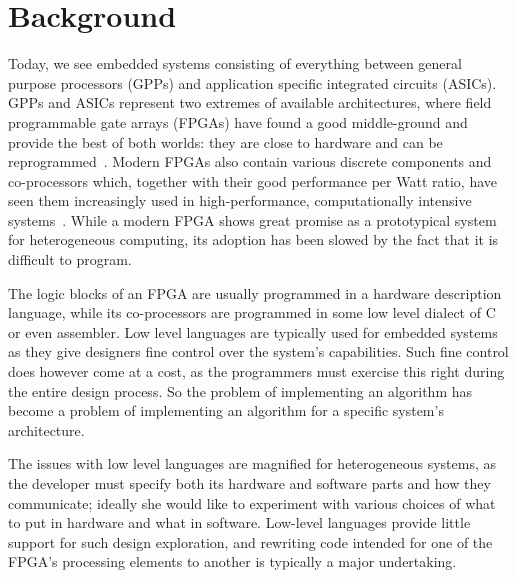 \documentclass[../paper.tex]{subfiles}
\begin{document}
\chapter{Background}
\label{background}


Today, we see embedded systems consisting of everything between general purpose processors (GPPs) and application specific integrated circuits (ASICs). GPPs and ASICs represent two extremes of available architectures, where field programmable gate arrays (FPGAs) have found a good middle-ground and provide the best of both worlds: they are close to hardware and can be reprogrammed~\cite{bacon2013}. Modern FPGAs also contain various discrete components and co-processors which, together with their good performance per Watt ratio, have seen them increasingly used in high-performance, computationally intensive systems~\cite{mcmillan2014}. While a modern FPGA shows great promise as a prototypical system for heterogeneous computing, its adoption has been slowed by the fact that it is difficult to program.


The logic blocks of an FPGA are usually programmed in a hardware description language, while its co-processors are programmed in some low level dialect of C or even assembler. Low level languages are typically used for embedded systems as they give designers fine control over the system's capabilities. Such fine control does however come at a cost, as the programmers must exercise this right during the entire design process. So the problem of implementing an algorithm has become a problem of implementing an algorithm for a specific system's architecture.

The issues with low level languages are magnified for heterogeneous systems, as the developer must specify both its hardware and software parts and how they communicate; ideally she would like to experiment with various choices of what to put in hardware and what in software. Low-level languages provide little support for such design exploration, and rewriting code intended for one of the FPGA's processing elements to another is typically a major undertaking.
\end{document}
